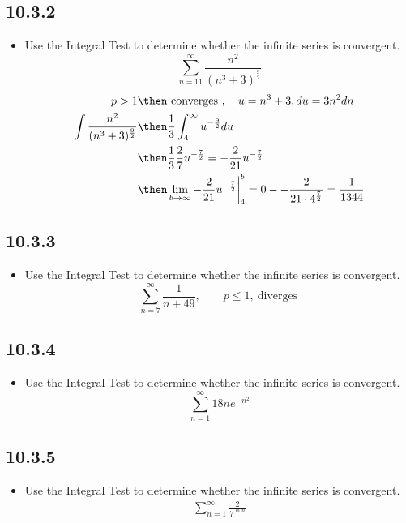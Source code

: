 \begin{itemize}
    \subsection{10.3.2}
    \begin{itemize}
      \item Use the Integral Test to determine whether the infinite series is
        convergent.
        \[%
          \sum_{n=11}^{\infty} \frac{n^2}{(n^3 + 3)^{\frac{9}{2}}}
        \]%
        \begin{align*}
          p > 1 &\then ~\text{converges}~, \quad u = n^3 + 3, du=3n^2dn \\
          \int \frac{n^2}{(n^3 + 3)^{\frac{9}{2}}}
                &\then \frac{1}{3} \int_4^\infty u^{-\frac{9}{2}}du \\
          &\then \frac{1}{3}\frac{2}{7}u^{-\frac{7}{2}} = -\frac{2}{21}u^{-\frac{7}{2}} \\
          &\then \lim_{b \to \infty} -\frac{2}{21}u^{-\frac{7}{2}}\bigg|_{4}^{b}
          = 0 - -\frac{2}{21 \cdot 4^{\frac{7}{2}}} = \frac{1}{1344}
        \end{align*}
    \end{itemize}

    \subsection{10.3.3}
    \begin{itemize}
      \item Use the Integral Test to determine whether the infinite series is
        convergent.
        \[%
         \sum_{n=7}^{\infty} \frac{1}{n+49}, \qquad p \leq 1, ~\text{diverges}~
        \]%
    \end{itemize}

    \subsection{10.3.4}
    \begin{itemize}
      \item Use the Integral Test to determine whether the infinite series is
        convergent.
        \[%
          \sum_{n=1}^{\infty} 18ne^{-n^2}
        \]%
    \end{itemize}

    \subsection{10.3.5}
    \begin{itemize}
      \item Use the Integral Test to determine whether the infinite series is
        convergent.
        \begin{align*}
          \sum_{n=1}^{\infty} \frac{2}{7^{\ln n}}
        \end{align*}
    \end{itemize}


\end{itemize}
